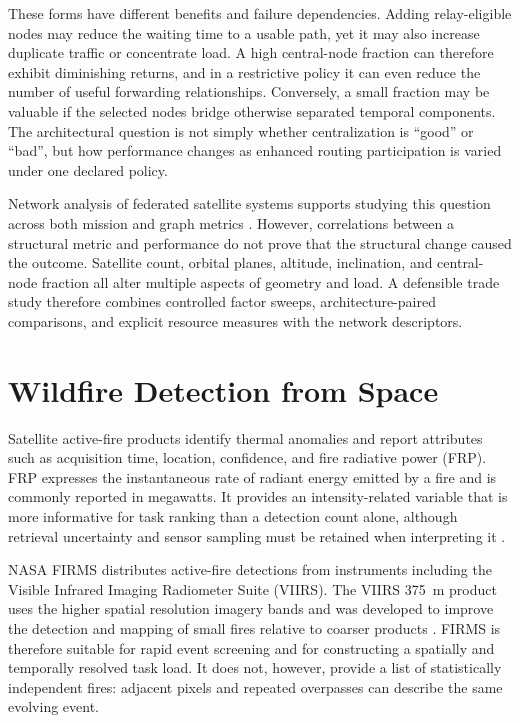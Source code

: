 These forms have different benefits and failure dependencies. Adding relay-eligible nodes may reduce the waiting time to a usable path, yet it may also increase duplicate traffic or concentrate load. A high central-node fraction can therefore exhibit diminishing returns, and in a restrictive policy it can even reduce the number of useful forwarding relationships. Conversely, a small fraction may be valuable if the selected nodes bridge otherwise separated temporal components. The architectural question is not simply whether centralization is ``good'' or ``bad'', but how performance changes as enhanced routing participation is varied under one declared policy.

Network analysis of federated satellite systems supports studying this question across both mission and graph metrics \citep{Scrocciolani2024}. However, correlations between a structural metric and performance do not prove that the structural change caused the outcome. Satellite count, orbital planes, altitude, inclination, and central-node fraction all alter multiple aspects of geometry and load. A defensible trade study therefore combines controlled factor sweeps, architecture-paired comparisons, and explicit resource measures with the network descriptors.

\section{Wildfire Detection from Space}

Satellite active-fire products identify thermal anomalies and report attributes such as acquisition time, location, confidence, and fire radiative power (FRP). FRP expresses the instantaneous rate of radiant energy emitted by a fire and is commonly reported in megawatts. It provides an intensity-related variable that is more informative for task ranking than a detection count alone, although retrieval uncertainty and sensor sampling must be retained when interpreting it \citep{Wooster2012}.

NASA FIRMS distributes active-fire detections from instruments including the Visible Infrared Imaging Radiometer Suite (VIIRS). The VIIRS 375~m product uses the higher spatial resolution imagery bands and was developed to improve the detection and mapping of small fires relative to coarser products \citep{Schroeder2014}. FIRMS is therefore suitable for rapid event screening and for constructing a spatially and temporally resolved task load. It does not, however, provide a list of statistically independent fires: adjacent pixels and repeated overpasses can describe the same evolving event.

